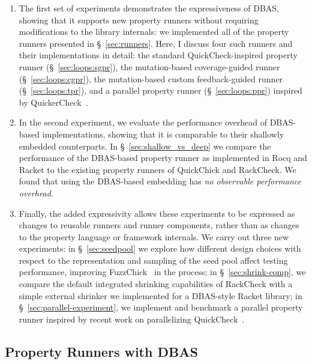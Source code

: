 \begin{enumerate}

  \item The first set of experiments demonstrates the expressiveness of DBAS, showing that it
        supports new property runners without requiring modifications to the library internals:
        we implemented all of the property runners presented in \S~\ref{sec:runners}. Here, I
        discuss four such runners and their implementations in detail: the standard
        QuickCheck-inspired property runner (\S~\ref{sec:loops:sgpr}), the mutation-based
        coverage-guided runner (\S~\ref{sec:loops:cgpr}), the mutation-based custom
        feedback-guided runner (\S~\ref{sec:loops:tpr}), and a parallel property runner
        (\S~\ref{sec:loops:ppr}) inspired by QuickerCheck~\cite{QuickerCheck}.

  \item In the second experiment, we evaluate the performance overhead of DBAS-based
        implementations, showing that it is comparable to their shallowly embedded
        counterparts. In \S~\ref{sec:shallow_vs_deep} we compare the performance of the
        DBAS-based property runner as implemented in Rocq and Racket to the existing property
        runners of QuickChick{} and RackCheck{}. We found that using the DBAS-based embedding
        has {\em no observable performance overhead}.

  \item Finally, the added expressivity allows these experiments to be expressed as changes to
        reusable runners and runner components, rather than as changes to the property language
        or framework internals. We carry out three new experiments: in \S~\ref{sec:seedpool} we
        explore how different design choices with respect to the representation and sampling of
        the seed pool affect testing performance, improving FuzzChick~\cite{FuzzChick} in the
        process; in \S~\ref{sec:shrink-comp}, we compare the default integrated shrinking
        capabilities of RackCheck{} with a simple external shrinker we implemented for a
        DBAS-style Racket library; in \S~\ref{sec:parallel-experiment}, we implement and
        benchmark a parallel property runner inspired by recent work on parallelizing
        QuickCheck~\cite{ParallelTesting}.
\end{enumerate}

\subsection{Property Runners with DBAS} \label{sec:property-runners}

